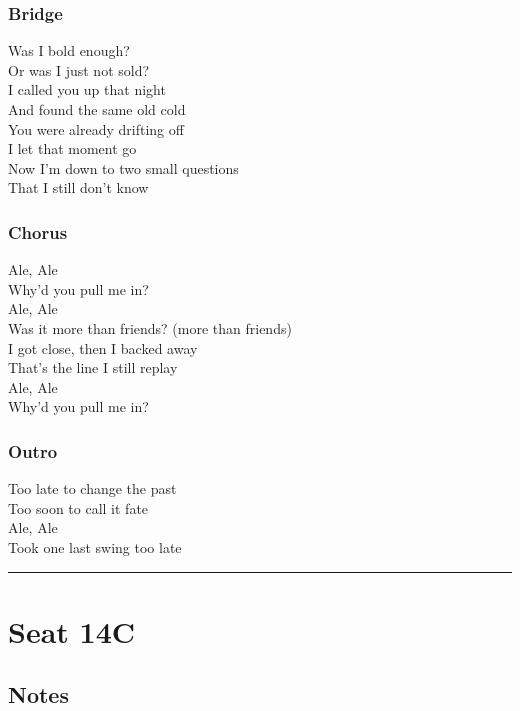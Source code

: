 \subsubsection{Bridge}\label{bridge-22}

Was I bold enough?\\
Or was I just not sold?\\
I called you up that night\\
And found the same old cold\\
You were already drifting off\\
I let that moment go\\
Now I'm down to two small questions\\
That I still don't know

\subsubsection{Chorus}\label{chorus-60}

Ale, Ale\\
Why'd you pull me in?\\
Ale, Ale\\
Was it more than friends? (more than friends)\\
I got close, then I backed away\\
That's the line I still replay\\
Ale, Ale\\
Why'd you pull me in?

\subsubsection{Outro}\label{outro-7}

Too late to change the past\\
Too soon to call it fate\\
Ale, Ale\\
Took one last swing too late

\begin{center}\rule{0.5\linewidth}{0.5pt}\end{center}

\section{Seat 14C}\label{seat-14c}

\subsection{Notes}\label{notes-29}


